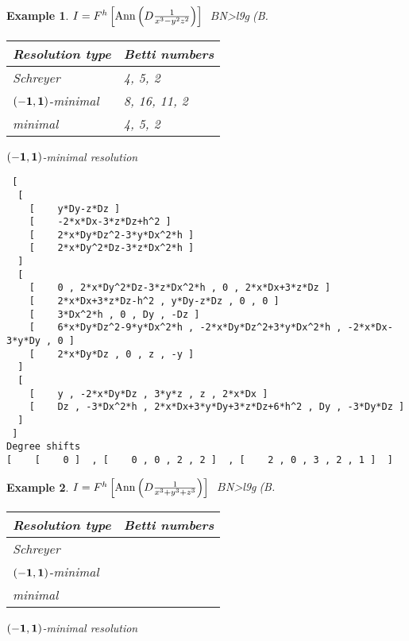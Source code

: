 \documentclass[12pt]{jarticle}
\newtheorem{example}{Example}
\begin{document}
\begin{example} \rm
$I = F^h\left[{\rm Ann}\left( D \frac{1}{x^3-y^2z^2} \right) \right]$
$B$N>l9g(B.

\begin{tabular}{|l|l|}
\hline
Resolution type &  Betti numbers          \\ \hline
Schreyer &                        4, 5, 2    \\ \hline
$(-{\bf 1},{\bf 1})$-minimal &    8, 16, 11, 2 \\ \hline
minimal &                         4, 5,  2    \\
\hline
\end{tabular}

\noindent
$(-{\bf 1},{\bf 1})$-minimal resolution
{\footnotesize \begin{verbatim}
 [ 
  [ 
    [    y*Dy-z*Dz ] 
    [    -2*x*Dx-3*z*Dz+h^2 ] 
    [    2*x*Dy*Dz^2-3*y*Dx^2*h ] 
    [    2*x*Dy^2*Dz-3*z*Dx^2*h ] 
  ]
  [ 
    [    0 , 2*x*Dy^2*Dz-3*z*Dx^2*h , 0 , 2*x*Dx+3*z*Dz ] 
    [    2*x*Dx+3*z*Dz-h^2 , y*Dy-z*Dz , 0 , 0 ] 
    [    3*Dx^2*h , 0 , Dy , -Dz ] 
    [    6*x*Dy*Dz^2-9*y*Dx^2*h , -2*x*Dy*Dz^2+3*y*Dx^2*h , -2*x*Dx-3*y*Dy , 0 ] 
    [    2*x*Dy*Dz , 0 , z , -y ] 
  ]
  [ 
    [    y , -2*x*Dy*Dz , 3*y*z , z , 2*x*Dx ] 
    [    Dz , -3*Dx^2*h , 2*x*Dx+3*y*Dy+3*z*Dz+6*h^2 , Dy , -3*Dy*Dz ] 
  ]
 ]
Degree shifts 
[    [    0 ]  , [    0 , 0 , 2 , 2 ]  , [    2 , 0 , 3 , 2 , 1 ]  ] 
\end{verbatim}}
\end{example}

\begin{example} \rm
$I = F^h\left[{\rm Ann}\left( D \frac{1}{x^3+y^3+z^3} \right) \right]$
$B$N>l9g(B.

\begin{tabular}{|l|l|}
\hline
Resolution type &  Betti numbers          \\ \hline
Schreyer &                            \\ \hline
$(-{\bf 1},{\bf 1})$-minimal &     \\ \hline
minimal &                             \\
\hline
\end{tabular}

\noindent
$(-{\bf 1},{\bf 1})$-minimal resolution
{\footnotesize \begin{verbatim}

\end{verbatim}}
\end{example}
\end{document}
